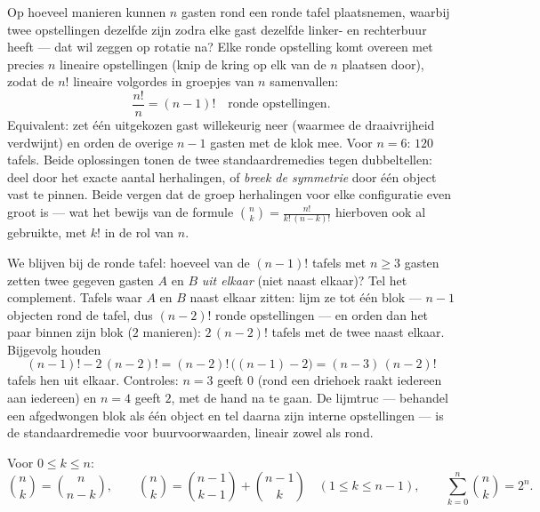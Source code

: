 \begin{example}\label{ex:b1:counting:roundtable}
Op hoeveel manieren kunnen $n$ gasten rond een ronde tafel plaatsnemen,
waarbij twee opstellingen dezelfde zijn zodra elke gast dezelfde linker-
en rechterbuur heeft --- dat wil zeggen op rotatie na? Elke ronde
opstelling komt overeen met precies $n$ lineaire opstellingen (knip de
kring op elk van de $n$ plaatsen door), zodat de $n!$ lineaire
volgordes in groepjes van $n$ samenvallen:
\[
\frac{n!}{n} = (n-1)! \quad\text{ronde opstellingen.}
\]
Equivalent: zet één uitgekozen gast willekeurig neer (waarmee de
draaivrijheid verdwijnt) en orden de overige $n - 1$ gasten met de
klok mee. Voor $n = 6$: $120$ tafels. Beide oplossingen tonen de twee
standaardremedies tegen dubbeltellen: deel door het exacte aantal
herhalingen, of \emph{breek de symmetrie} door één object vast te
pinnen. Beide vergen dat de groep herhalingen voor elke configuratie
even groot is --- wat het bewijs van de formule $\binom nk =
\frac{n!}{k!\,(n-k)!}$ hierboven ook al gebruikte, met $k!$ in de rol
van $n$.
\end{example}

\begin{example}\label{ex:b1:counting:constraint}
We blijven bij de ronde tafel: hoeveel van de $(n-1)!$ tafels met $n
\geq 3$ gasten zetten twee gegeven gasten $A$ en $B$ \emph{uit
elkaar} (niet naast elkaar)? Tel het complement. Tafels waar $A$ en
$B$ naast elkaar zitten: lijm ze tot één blok --- $n - 1$ objecten
rond de tafel, dus $(n-2)!$ ronde opstellingen --- en orden dan het
paar binnen zijn blok ($2$ manieren): $2\,(n-2)!$ tafels met de twee
naast elkaar. Bijgevolg houden
\[
(n-1)! - 2\,(n-2)! = (n-2)!\,\bigl((n - 1) - 2\bigr)
= (n-3)\,(n-2)!
\]
tafels hen uit elkaar. Controles: $n = 3$ geeft $0$ (rond een
driehoek raakt iedereen aan iedereen) en $n = 4$ geeft $2$, met de
hand na te gaan. De lijmtruc --- behandel een afgedwongen blok als
één object en tel daarna zijn interne opstellingen --- is de
standaardremedie voor buurvoorwaarden, lineair zowel als rond.
\end{example}

\begin{proposition}[Basisidentiteiten]\label{prop:b1:counting:identities}
Voor $0 \leq k \leq n$:
\[
\binom{n}{k} = \binom{n}{n-k},
\qquad
\binom{n}{k} = \binom{n-1}{k-1} + \binom{n-1}{k}
\quad (1 \leq k \leq n-1),
\qquad
\sum_{k=0}^{n} \binom{n}{k} = 2^n .
\]
\end{proposition}

